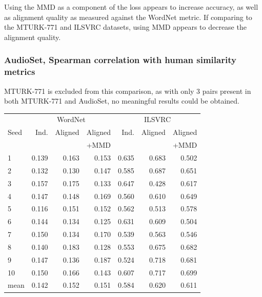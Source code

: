 Using the MMD as a component of the loss appears to increase accuracy, as well as alignment quality as measured against the WordNet metric. If comparing to the MTURK-771 and ILSVRC datasets, using MMD appears to decrease the alignment quality.  

\subsubsection{AudioSet, Spearman correlation with human similarity metrics}

MTURK-771 is excluded from this comparison, as with only 3 pairs present in both MTURK-771 and AudioSet, no meaningful results could be obtained. 

\begin{table}[H]
\centering
\begin{tabular}{lrrrrrr}
  \toprule
\multicolumn{1}{r}{} & \multicolumn{3}{c}{WordNet} & \multicolumn{3}{c}{ILSVRC} \\
\cmidrule(lr){2-4} \cmidrule(lr){5-7} 
{Seed} &  Ind. &   Aligned &  Aligned  & Ind. &   Aligned &  Aligned   \\
{}     &       &           & +MMD      &      &           &   +MMD     \\
\midrule
1    &    0.139 &  0.163 &   0.153 &   0.635 &  0.683 &   0.502    \\
2    &    0.132 &  0.130 &   0.147 &   0.585 &  0.687 &   0.651   \\
3    &    0.157 &  0.175 &   0.133 &   0.647 &  0.428 &   0.617   \\
4    &    0.147 &  0.148 &   0.169 &   0.560 &  0.610 &   0.649   \\
5    &    0.116 &  0.151 &   0.152 &   0.562 &  0.513 &   0.578   \\
6    &    0.144 &  0.134 &   0.125 &   0.631 &  0.609 &   0.504   \\
7    &    0.150 &  0.134 &   0.170 &   0.539 &  0.563 &   0.546   \\
8    &    0.140 &  0.183 &   0.128 &   0.553 &  0.675 &   0.682   \\
9    &    0.147 &  0.136 &   0.187 &   0.524 &  0.718 &   0.681   \\
10   &    0.150 &  0.166 &   0.143 &   0.607 &  0.717 &   0.699   \\
\midrule                                                                   
mean &    0.142 &  0.152 &   0.151 &   0.584 &  0.620 &   0.611   \\
\bottomrule
\end{tabular}
\end{table}



